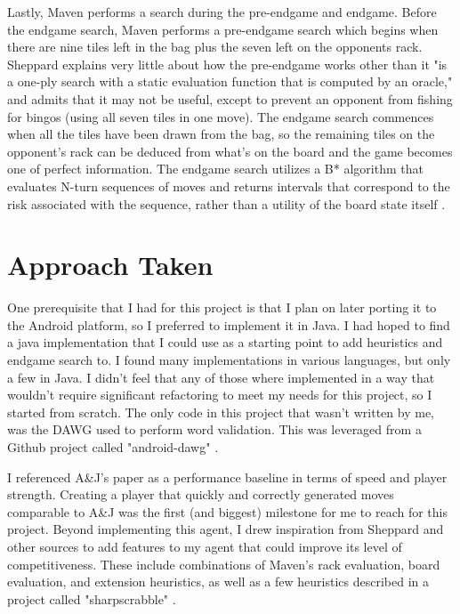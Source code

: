 \documentclass[letterpaper]{article}
\begin{document}
Lastly, Maven performs a search during the pre-endgame and endgame. Before the endgame search, Maven performs a pre-endgame search which begins when there are nine tiles left in the bag plus the seven left on the opponents rack. Sheppard explains very little about how the pre-endgame works other than it "is a one-ply search with a static evaluation function that is computed by an oracle," and admits that it may not be useful, except to prevent an opponent from fishing for bingos (using all seven tiles in one move). The endgame search commences when all the tiles have been drawn from the bag, so the remaining tiles on the opponent's rack can be deduced from what's on the board and the game becomes one of perfect information. The endgame search utilizes a B* algorithm that evaluates N-turn sequences of moves and returns intervals that correspond to the risk associated with the sequence, rather than a utility of the board state itself \cite{1sheppard2002}.

\section{Approach Taken}
One prerequisite that I had for this project is that I plan on later porting it to the Android platform, so I preferred to implement it in Java. I had hoped to find a java implementation that I could use as a starting point to add heuristics and endgame search to. I found many implementations in various languages, but only a few in Java. I didn't feel that any of those where implemented in a way that wouldn't require significant refactoring to meet my needs for this project, so I started from scratch. The only code in this project that wasn't written by me, was the DAWG used to perform word validation. This was leveraged from a Github project called "android-dawg" \cite{icantrap}.

I referenced A\&J's paper as a performance baseline in terms of speed and player strength. Creating a player that quickly and correctly generated moves comparable to A\&J was the first (and biggest) milestone for me to reach for this project. Beyond implementing this agent, I drew inspiration from Sheppard and other sources to add features to my agent that could improve its level of competitiveness. These include combinations of Maven's rack evaluation, board evaluation, and extension heuristics, as well as a few heuristics described in a project called "sharpscrabble" \cite{sharpscrabble}.
\end{document}
